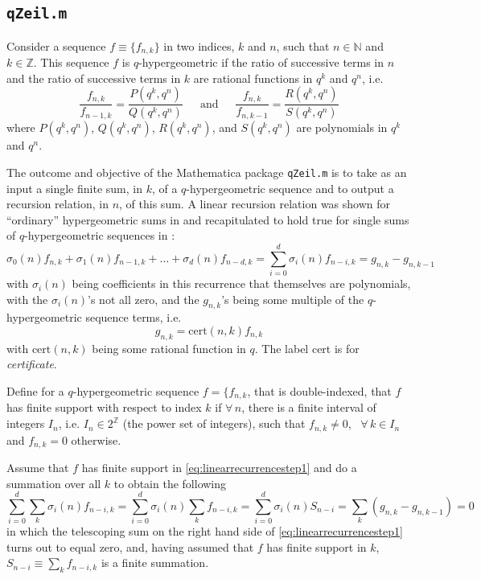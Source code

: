 \documentclass[a4paper,titlepage,twoside]{book}
\begin{document}
\begin{appendix}
\section{\texttt{qZeil.m} }\label{sec:qZeil}

Consider a sequence $f \equiv \lbrace f_{n,k} \rbrace$ in two indices, $k$ and $n$, such that $n\in \mathbb{N}$ and $k\in \mathbb{Z}$.  This sequence $f$ is $q$-hypergeometric if the ratio of successive terms in $n$ and the ratio of successive terms in $k$ are rational functions in $q^k$ and $q^n$, i.e.
\[
\frac{ f_{n,k}}{ f_{n-1,k} } = \frac{P(q^k,q^n)}{Q(q^k,q^n)} \quad \, \text{ and } \quad \, \frac{ f_{n,k} }{ f_{n,k-1}} = \frac{R(q^k,q^n)}{ S(q^k,q^n)} 
\]
where $P(q^k,q^n)$, $Q(q^k,q^n)$, $R(q^k,q^n)$, and $S(q^k,q^n)$ are polynomials in $q^k$ and $q^n$.  

The outcome and objective of the Mathematica package \texttt{qZeil.m} is to take as an input a single finite sum, in $k$, of a $q$-hypergeometric sequence and to output a recursion relation, in $n$, of this sum.  A linear recursion relation was shown for ``ordinary'' hypergeometric sums in \cite{WZ1994} and recapitulated to hold true for single sums of $q$-hypergeometric sequences in \cite{RieseqZeil}:
\begin{equation}
  \sigma_0{(n)} f_{n,k} + \sigma_1{(n)} f_{n-1,k} + \dots + \sigma_d{(n)} f_{n-d,k} = \sum_{i=0}^d \sigma_i{(n)}f_{n-i,k} = g_{n,k} - g_{n,k-1} \label{eq:linearrecurrencestep1}
\end{equation}
with $\sigma_i{(n)}$ being coefficients in this recurrence that themselves are polynomials, with the $\sigma_i{(n)}$'s not all zero, and the $g_{n,k}$'s being some multiple of the $q$-hypergeometric sequence terms, i.e.
\[
g_{n,k} = \text{cert}{(n,k)} f_{n,k}
\]
with $\text{cert}{(n,k)}$ being some rational function in $q$.  The label $\text{cert}$ is for \emph{certificate}.

Define for a $q$-hypergeometric sequence $f = \lbrace f_{n,k}$, that is double-indexed, that $f$ has finite support with respect to index $k$ if $\forall \, n$, there is a finite interval of integers $I_n$, i.e. $I_n \in 2^{\mathbb{Z}}$ (the power set of integers), such that $f_{n,k} \neq 0$, \, $\forall \, k \in I_n$ and $f_{n,k} =0$ otherwise.  

Assume that $f$ has finite support in \eqref{eq:linearrecurrencestep1} and do a summation over all $k$ to obtain the following
\begin{equation}
\sum_{i=0}^d \sum_k \sigma_i(n) f_{n-i,k} = \sum_{i=0}^d \sigma_i{(n)} \sum_{k} f_{n-i,k} = \sum_{i=0}^d \sigma_i{(n)} S_{n-i} = \sum_{k} { (g_{n,k} -  g_{n,k-1} ) } = 0  \label{eq:linearrecurrencestep2}
\end{equation}
in which the telescoping sum on the right hand side of \eqref{eq:linearrecurrencestep1} turns out to equal zero, and, having assumed that $f$ has finite support in $k$, $S_{n-i} \equiv \sum_k f_{n-i,k}$ is a finite summation.  


\end{appendix}
\end{document}
